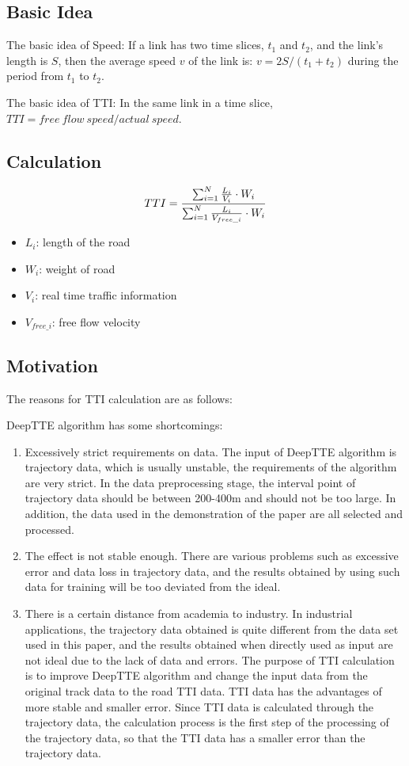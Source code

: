 \documentclass[fontset=none]{ctexart}
\theoremstyle{definition}
\theoremstyle{remark}
\begin{document}
\subsection{Basic Idea}
The basic idea of Speed: If a link has two time slices, $t_1$ and $t_2$, and the link's length is $S$, then the average speed $v$ of the link is: $v = 2S / (t_1 + t_2)$ during the period from $t_1$ to $t_2$.

The basic idea of TTI: In the same link in a time slice, $TTI = free\ flow\ speed / actual\ speed$.

\subsection{Calculation}
\begin{equation}
  TTI=\frac{\sum_{i=1}^N\frac{L_i}{V_i}\cdot W_i}{\sum_{i=1}^N\frac{L_i}{V_{free\_i}}\cdot W_i} \notag
\end{equation}
\begin{itemize}
  \item $L_i$: length of the road
  \item $W_i$: weight of road
  \item $V_i$: real time traffic information
  \item $V_{free\_i}$: free flow velocity
\end{itemize}

\subsection{Motivation}
The reasons for TTI calculation are as follows:

DeepTTE algorithm has some shortcomings:
\begin{enumerate}
  \item Excessively strict requirements on data. The input of DeepTTE algorithm is trajectory data, which is usually unstable, the requirements of the algorithm are very strict. In the data preprocessing stage, the interval point of trajectory data should be between 200-400m and should not be too large. In addition, the data used in the demonstration of the paper are all selected and processed.
  \item The effect is not stable enough. There are various problems such as excessive error and data loss in trajectory data, and the results obtained by using such data for training will be too deviated from the ideal.
  \item There is a certain distance from academia to industry. In industrial applications, the trajectory data obtained is quite different from the data set used in this paper, and the results obtained when directly used as input are not ideal due to the lack of data and errors.
  The purpose of TTI calculation is to improve DeepTTE algorithm and change the input data from the original track data to the road TTI data. TTI data has the advantages of more stable and smaller error. Since TTI data is calculated through the trajectory data, the calculation process is the first step of the processing of the trajectory data, so that the TTI data has a smaller error than the trajectory data.  
\end{enumerate}
\end{document}
